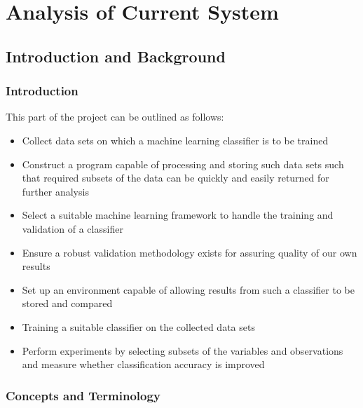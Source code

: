 \part{Analysis of Current System}
\chapter{Introduction and Background}
\ifpdf
    \graphicspath{{Chapter2/Figs/Raster/}{Chapter2/Figs/PDF/}{Chapter2/Figs/}}
\else
    \graphicspath{{Chapter2/Figs/Vector/}{Chapter2/Figs/}}
\fi

\section{Introduction}

This part of the project can be outlined as follows:

\begin{itemize}
    \item Collect data sets on which a machine learning classifier is to be trained
    \item Construct a program capable of processing and storing such data sets
        such that required subsets of the data can be quickly and easily
        returned for further analysis
    \item Select a suitable machine learning framework to handle the training
        and validation of a classifier
    \item Ensure a robust validation methodology exists for assuring quality of
        our own results
    \item Set up an environment capable of allowing results from such a
        classifier to be stored and compared
    \item Training a suitable classifier on the collected data sets
    \item Perform experiments by selecting subsets of the variables and
        observations and measure whether classification accuracy is improved
\end{itemize}


\section{Concepts and Terminology}
